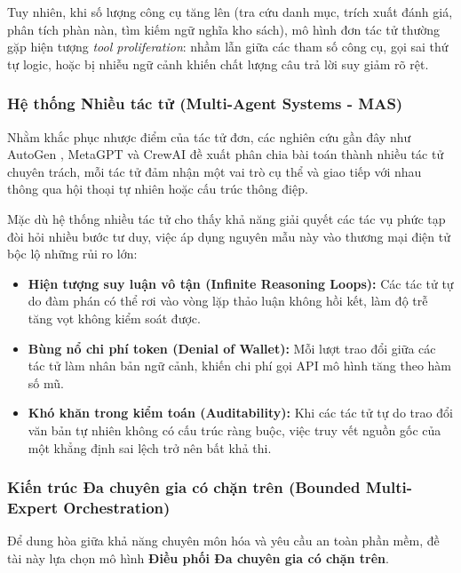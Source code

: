 Tuy nhiên, khi số lượng công cụ tăng lên (tra cứu danh mục, trích xuất đánh giá, phân tích phàn nàn, tìm kiếm ngữ nghĩa kho sách), mô hình đơn tác tử thường gặp hiện tượng \textit{tool proliferation}: nhầm lẫn giữa các tham số công cụ, gọi sai thứ tự logic, hoặc bị nhiễu ngữ cảnh khiến chất lượng câu trả lời suy giảm rõ rệt.

\subsubsection{Hệ thống Nhiều tác tử (Multi-Agent Systems - MAS)}
Nhằm khắc phục nhược điểm của tác tử đơn, các nghiên cứu gần đây như AutoGen , MetaGPT  và CrewAI đề xuất phân chia bài toán thành nhiều tác tử chuyên trách, mỗi tác tử đảm nhận một vai trò cụ thể và giao tiếp với nhau thông qua hội thoại tự nhiên hoặc cấu trúc thông điệp.

Mặc dù hệ thống nhiều tác tử cho thấy khả năng giải quyết các tác vụ phức tạp đòi hỏi nhiều bước tư duy, việc áp dụng nguyên mẫu này vào thương mại điện tử bộc lộ những rủi ro lớn:
\begin{itemize}
    \item \textbf{Hiện tượng suy luận vô tận (Infinite Reasoning Loops):} Các tác tử tự do đàm phán có thể rơi vào vòng lặp thảo luận không hồi kết, làm độ trễ tăng vọt không kiểm soát được.
    \item \textbf{Bùng nổ chi phí token (Denial of Wallet):} Mỗi lượt trao đổi giữa các tác tử làm nhân bản ngữ cảnh, khiến chi phí gọi API mô hình tăng theo hàm số mũ.
    \item \textbf{Khó khăn trong kiểm toán (Auditability):} Khi các tác tử tự do trao đổi văn bản tự nhiên không có cấu trúc ràng buộc, việc truy vết nguồn gốc của một khẳng định sai lệch trở nên bất khả thi.
\end{itemize}

\subsubsection{Kiến trúc Đa chuyên gia có chặn trên (Bounded Multi-Expert Orchestration)}
Để dung hòa giữa khả năng chuyên môn hóa và yêu cầu an toàn phần mềm, đề tài này lựa chọn mô hình \textbf{Điều phối Đa chuyên gia có chặn trên}. 

